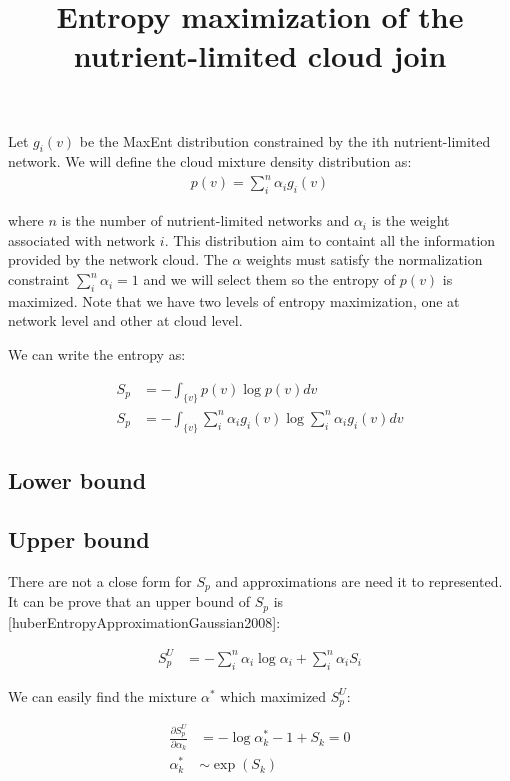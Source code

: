 \documentclass[11pt, letterpaper]{article}
\title{\textbf{Entropy maximization of the nutrient-limited cloud join}}
\date{}
\begin{document}
\maketitle

Let $g_i(v)$ be the MaxEnt distribution constrained by the ith nutrient-limited network.
We will define the cloud mixture density distribution as:
\begin{align}
    p(v) = \sum_i^n \alpha_i g_i(v)
\end{align}

where $n$ is the number of nutrient-limited networks and $\alpha_i$ is the weight associated with network $i$.
This distribution aim to containt all the information provided by the network cloud.
The $\alpha$ weights must satisfy the normalization constraint $\sum_i^n \alpha_i = 1$ and we will select them so the entropy of $p(v)$ is maximized.
Note that we have two levels of entropy maximization, one at network level and other at cloud level. 

We can write the entropy as:

\begin{align}
    S_p &= - \int_{\{v\}} p(v) \log{p(v)} dv \\
    S_p &= - \int_{\{v\}} \sum_i^n \alpha_i g_i(v) \log{ \sum_i^n \alpha_i g_i(v) } dv \nonumber
\end{align}

\subsection{Lower bound}

\subsection{Upper bound}

There are not a close form for $S_p$ and approximations are need it to represented. 
It can be prove that an upper bound of $S_p$ is [huberEntropyApproximationGaussian2008]:

\begin{align}
    S_p^U &= - \sum_i^n \alpha_i \log \alpha_i + \sum_i^n \alpha_i S_i
\end{align}

We can easily find the mixture $\alpha^*$ which maximized $S_p^U$: 

\begin{align}
    \frac{\partial{S_p^U}}{\partial{\alpha_k}} &= - \log \alpha_k^* - 1 + S_k = 0 \\
    \alpha_k^* &\sim \exp (S_k)
\end{align}
\end{document}
